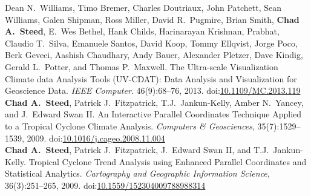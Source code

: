 \documentclass[11pt, letterpaper]{article}
\newcommand{\amper}{{\fontspec[Scale=.95]{Hoefler Text}\selectfont\itshape\&}}
\newcommand{\years}[1]{\marginnote{\scriptsize #1}}
\begin{document}
\begin{sloppypar}
\newpage

\years{2013}Dean N.\ Williams, Timo Bremer, Charles Doutriaux, John Patchett,
Sean Williams, Galen Shipman, Ross Miller, David R.\ Pugmire, Brian Smith,
\textbf{Chad A.\ Steed}, E.\ Wes Bethel, Hank Childs, Harinarayan Krishnan,
Prabhat, Claudio T.\ Silva, Emanuele Santos, David Koop, Tommy Ellqvist,
Jorge Poco, Berk Geveci, Aashish Chaudhary, Andy Bauer, Alexander Pletzer,
Dave Kindig, Gerald L.\ Potter, and Thomas P.\ Maxwell. The Ultra-scale
Visualization Climate data Analysis Tools (UV-CDAT): Data Analysis and
Visualization for Geoscience Data. \emph{IEEE Computer}. 46(9):68--76, 2013.
doi:\href{http://dx.doi.org/10.1109/MC.2013.119}{10.1109/MC.2013.119}\\
\years{2009}\textbf{Chad A.\ Steed}, Patrick J.\ Fitzpatrick, T.J.\ Jankun-Kelly,
Amber N.\ Yancey, and J.\ Edward Swan II. An Interactive
Parallel Coordinates Technique Applied to a Tropical Cyclone Climate
Analysis. \emph{Computers \amper{} Geosciences}, 35(7):1529--1539, 2009.
doi:\href{http://dx.doi.org/10.1016/j.cageo.2008.11.004}
{10.1016/j.cageo.2008.11.004}\\
\years{2009}\textbf{Chad A.\ Steed}, Patrick J.\ Fitzpatrick, J.\ Edward Swan
II, and T.J.\ Jankun-Kelly. Tropical Cyclone Trend Analysis using Enhanced
Parallel Coordinates and Statistical Analytics. \emph{Cartography and
Geographic Information Science}, 36(3):251--265, 2009.
doi:\href{http://dx.doi.org/10.1559/152304009788988314}{10.1559/152304009788988314}
\end{sloppypar}
\end{document}
